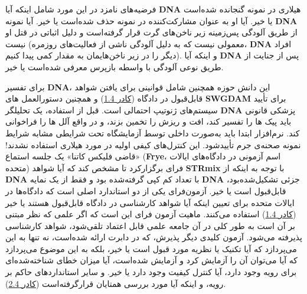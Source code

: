 فرضیه‌های نامزد در این مورد شامل اینکه آیا \textenglish{\textbf{DNA}} هیلاری در نمونه گنجانده شده‌است یا خیر.
آیا او به عنوان مشارکت‌کننده در نمونه حذف شده‌است یا خیر.
آیا نمونه \textenglish{\textbf{DNA}} از طریق آلودگی پس‌زمینه زیر ناخن‌های گرت قرار گرفته‌است و دلیل اثباتی در قتل او نیست (معمولی نیست که به دلیل آلودگی ناشی از فعالیت‌های روزمره، \textenglish{\textbf{DNA}} افراد دیگر را در زیر ناخن‌هایمان به مقدار کمی پیدا کنیم).
و اینکه آیا \textenglish{\textbf{DNA}} پس از جنایت از طریق نوعی آلودگی با واسطه بازپرس معرفی شده‌است یا خیر.

برای تفسیر \textenglish{\textbf{DNA}}، این دانش حوزه همچنین شامل قوانینی برای یافتن شواهد قابل‌قبول در دادگاه (\hyperref[sec:کادر 1.4]{کادر 1.4}) و همچنین دستورالعمل های \textenglish{\textbf{SWGDAM}} برای تأیید سیستم‌های ژنوتیپ احتمالی است.
قبل از استفاده، یک تحلیلگر \textenglish{\textbf{DNA}} پزشکی قانونی باید پیک ها را تفسیر کند، افت و ریزش را تخمین بزند، و در واقع آلل ها را فراخوانی کند.
نرم‌افزار ابتدا باید به‌صورت داخلی توسط آزمایشگاه تحت شرایطی مشابه شرایط نمونه صحنه‌ی جرم تأیید‌شود.
این کنترل‌های کیفی اولیه در مورد هیلاری استفاده نشدند!
«قاضی فلیکس کاتنا» یک جلسه استماع (\textenglish{\textbf{Frye}}، اسم آزمونی در دادگاه‌های ایالات متحده) فرای برگزار‌کرد تا مشخص کند که آیا شواهد \textenglish{\textbf{STRmix}} با توجه به اینکه از \textenglish{\textbf{DNA}} با تعداد کم کپی گرفته‌شده بود و فقط از یک نمایه \textenglish{\textbf{DNA}} جزئی تشکیل‌شده‌بود، قابل‌قبول است یا خیر.
آزمون‌فرای یکی از دو استاندارد اصلی است که دادگاه‌ها در ایالات متحده برای تعیین اینکه آیا شواهد کارشناسی در دادگاه قابل‌قبول هستند یا خیر (\hyperref[sec:کادر 1.4]{کادر 1.4}) استفاده می‌کنند.
ماهیت آزمون فرای این است که اگر علمی که نظر مبتنی بر آن است به طور کلی در آن جامعه علمی قابل اعتماد تلقی‌شود، شواهد کارشناسی پذیرفته می‌شود.
آزمون کلیدی دیگر پذیرش، که در دابرت ارائه شده‌است، نه تنها به این می‌پردازد که آیا تکنیک یا نظریه مورد قبول است یا خیر، بلکه به این موضوع می‌پردازد که آیا می‌توان آن را آزمایش کرد و آزمایش شده‌است، آیا میزان خطای شناخته‌شده‌ای برای رویه وجود دارد، آیا کنترل کیفیت وجود دارد یا خیر.
و سایر استانداردهای حاکم بر رویه، و اینکه آیا مورد بررسی همتایان قرار‌گرفته‌است (\hyperref[sec:کادر 2.4]{کادر 2.4}).





